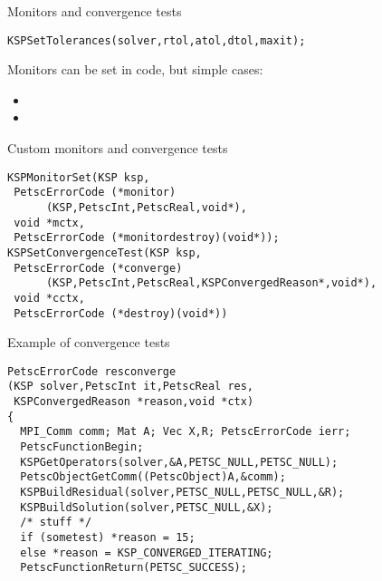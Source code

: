 \begin{numberedframe}{Monitors and convergence tests}
\begin{lstlisting}
KSPSetTolerances(solver,rtol,atol,dtol,maxit);
\end{lstlisting}
Monitors can be set in code, but simple cases:
\begin{itemize}
\item {}
\item {}
\end{itemize}
\end{numberedframe}

\begin{numberedframe}{Custom monitors and convergence tests}
\begin{lstlisting}
KSPMonitorSet(KSP ksp,
 PetscErrorCode (*monitor)
      (KSP,PetscInt,PetscReal,void*),
 void *mctx,
 PetscErrorCode (*monitordestroy)(void*));
KSPSetConvergenceTest(KSP ksp,
 PetscErrorCode (*converge)
      (KSP,PetscInt,PetscReal,KSPConvergedReason*,void*),
 void *cctx,
 PetscErrorCode (*destroy)(void*))
\end{lstlisting}
\end{numberedframe}

\begin{numberedframe}{Example of convergence tests}
\begin{lstlisting}
PetscErrorCode resconverge
(KSP solver,PetscInt it,PetscReal res,
 KSPConvergedReason *reason,void *ctx)
{
  MPI_Comm comm; Mat A; Vec X,R; PetscErrorCode ierr;
  PetscFunctionBegin;
  KSPGetOperators(solver,&A,PETSC_NULL,PETSC_NULL);
  PetscObjectGetComm((PetscObject)A,&comm); 
  KSPBuildResidual(solver,PETSC_NULL,PETSC_NULL,&R);
  KSPBuildSolution(solver,PETSC_NULL,&X); 
  /* stuff */
  if (sometest) *reason = 15;
  else *reason = KSP_CONVERGED_ITERATING;
  PetscFunctionReturn(PETSC_SUCCESS);
\end{lstlisting}
\end{numberedframe}



